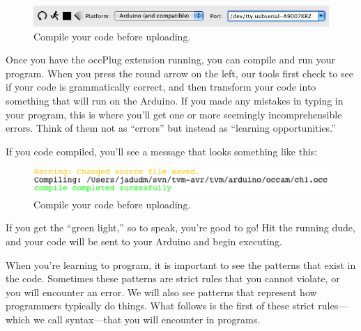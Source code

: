 \begin{figure}[ht]
  \begin{center}
    \includegraphics[width=1.0\linewidth]{screenshots/20100108-compile-button}
    \caption{Compile your code before uploading.}
    \label{screenshot:compile-button}
  \end{center}
\end{figure}

Once you have the occPlug extension running, you can compile and run your program. When you press the round arrow on the left, our tools first check to see if your code is grammatically correct, and then transform your code into something that will run on the Arduino. If you made any mistakes in typing in your program, this is where you'll get one or more seemingly incomprehensible errors. Think of them not as ``errors'' but instead as ``learning opportunities.''
         
                                
If you code compiled, you'll see a message that looks something like this:

\begin{figure}[ht]
  \begin{center}
    \includegraphics[width=0.8\linewidth]{screenshots/20100108-compile-successful}
    \caption{Compile your code before uploading.}
    \label{screenshot:compile-successful}
  \end{center}
\end{figure}

If you get the ``green light,'' so to speak, you're good to go! Hit the running dude, and your code will be sent to your Arduino and begin executing.

\PATTERNS
When you're learning to program, it is important to see the patterns that exist in the code. Sometimes these patterns are strict rules that you cannot violate, or you will encounter an error. We will also see patterns that represent how programmers typically do things. What follows is the first of these strict rules---which we call {\strong syntax}---that you will encounter in \occam programs. 

